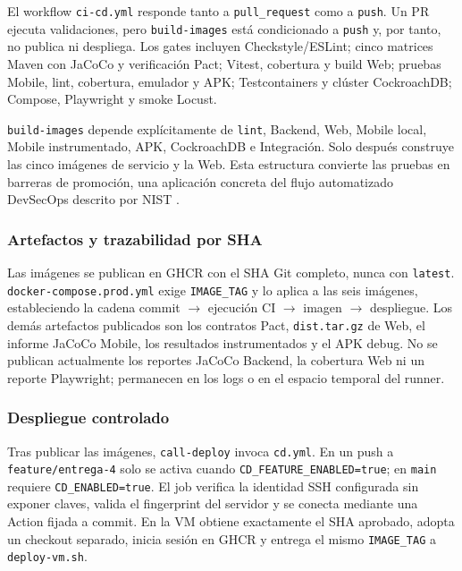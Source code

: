 El workflow \texttt{ci-cd.yml} responde tanto a \texttt{pull\_request} como a
\texttt{push}. Un PR ejecuta validaciones, pero \texttt{build-images} está
condicionado a \texttt{push} y, por tanto, no publica ni despliega. Los gates
incluyen Checkstyle/ESLint; cinco matrices Maven con JaCoCo y verificación Pact;
Vitest, cobertura y build Web; pruebas Mobile, lint, cobertura, emulador y APK;
Testcontainers y clúster CockroachDB; Compose, Playwright y smoke Locust.

\texttt{build-images} depende explícitamente de \texttt{lint}, Backend, Web,
Mobile local, Mobile instrumentado, APK, CockroachDB e Integración. Solo después
construye las cinco imágenes de servicio y la Web. Esta estructura convierte las
pruebas en barreras de promoción, una aplicación concreta del flujo automatizado
DevSecOps descrito por NIST \cite{chandramouli2022nistdevsecops}.

\subsubsection{Artefactos y trazabilidad por SHA}

Las imágenes se publican en GHCR con el SHA Git completo, nunca con
\texttt{latest}. \texttt{docker-compose.prod.yml} exige \texttt{IMAGE\_TAG} y lo
aplica a las seis imágenes, estableciendo la cadena
commit $\rightarrow$ ejecución CI $\rightarrow$ imagen $\rightarrow$ despliegue.
Los demás artefactos publicados son los contratos Pact, \texttt{dist.tar.gz} de
Web, el informe JaCoCo Mobile, los resultados instrumentados y el APK debug. No
se publican actualmente los reportes JaCoCo Backend, la cobertura Web ni un
reporte Playwright; permanecen en los logs o en el espacio temporal del runner.

\subsubsection{Despliegue controlado}

Tras publicar las imágenes, \texttt{call-deploy} invoca \texttt{cd.yml}. En un
push a \texttt{feature/entrega-4} solo se activa cuando
\texttt{CD\_FEATURE\_ENABLED=true}; en \texttt{main} requiere
\texttt{CD\_ENABLED=true}. El job verifica la identidad SSH configurada sin
exponer claves, valida el fingerprint del servidor y se conecta mediante una
Action fijada a commit. En la VM obtiene exactamente el SHA aprobado, adopta un
checkout separado, inicia sesión en GHCR y entrega el mismo \texttt{IMAGE\_TAG} a
\texttt{deploy-vm.sh}.

